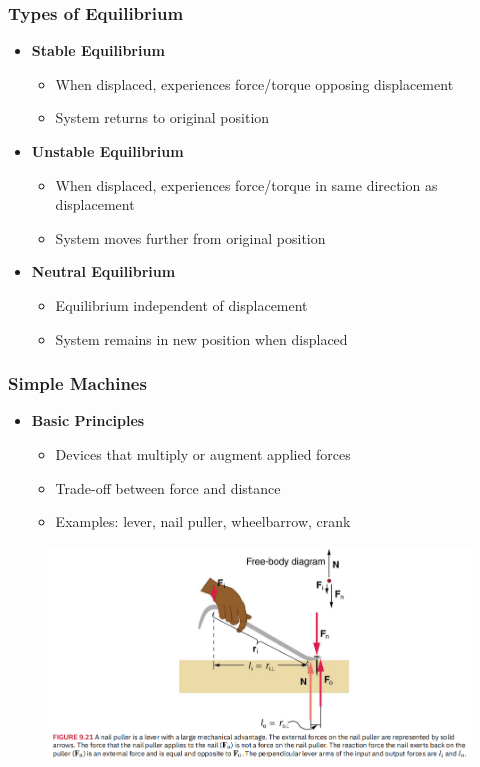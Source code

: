 \documentclass{beamer}
\begin{document}
\begin{frame}
\frametitle{Types of Equilibrium}
\begin{itemize}
    \item \textbf{Stable Equilibrium}
    \begin{itemize}
        \item When displaced, experiences force/torque opposing displacement
        \item System returns to original position
    \end{itemize}
    \item \textbf{Unstable Equilibrium}
    \begin{itemize}
        \item When displaced, experiences force/torque in same direction as displacement
        \item System moves further from original position
    \end{itemize}
    \item \textbf{Neutral Equilibrium}
    \begin{itemize}
        \item Equilibrium independent of displacement
        \item System remains in new position when displaced
    \end{itemize}
\end{itemize}
\end{frame}

\begin{frame}
\frametitle{Simple Machines}
\begin{itemize}
    \item \textbf{Basic Principles}
    \begin{itemize}
        \item Devices that multiply or augment applied forces
        \item Trade-off between force and distance
        \item Examples: lever, nail puller, wheelbarrow, crank
    \end{itemize}
    \end{itemize}
\begin{figure}[H]
    \centering
    \includegraphics[width=1\linewidth]{CH9/Screenshot 2024-11-04 120252.png}
\end{figure}
    
\end{frame}
\end{document}
